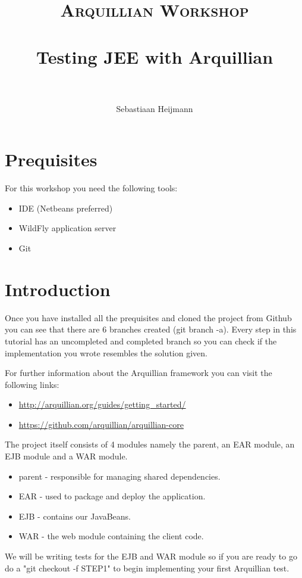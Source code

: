 \documentclass[paper=a4, fontsize=11pt]{scrartcl}
\title{
\normalfont \normalsize
\textsc{Arquillian Workshop} \\ [25pt] %
\horrule{0.5pt} \\[0.4cm] %
\huge Testing JEE with Arquillian\\ %
\horrule{2pt} \\[0.5cm] %
}
\author{Sebastiaan Heijmann} %
\begin{document}
\maketitle %

\tableofcontents

\section{Prequisites}
For this workshop you need the following tools:
\begin{itemize}
		\item IDE (Netbeans preferred)
		\item WildFly application server
		\item Git
\end{itemize}

\section{Introduction}
Once you have installed all the prequisites and cloned the project from Github
you can see that there are 6 branches created (git branch -a). Every step in
this tutorial has an uncompleted and completed branch so you can check if the
implementation you wrote resembles the solution given.
\par
For further information about the Arquillian framework you can visit the
following links:
\begin{itemize}
	\item \url{http://arquillian.org/guides/getting_started/}
	\item \url{https://github.com/arquillian/arquillian-core}
\end{itemize}
\par
The project itself consists of 4 modules namely the parent, an EAR module, an EJB
module and a WAR module.
\begin{itemize}
		\item parent - responsible for managing shared dependencies.
		\item EAR - used to package and deploy the application.
		\item EJB - contains our JavaBeans.
		\item WAR - the web module containing the client code.
\end{itemize}
We will be writing tests for the EJB and WAR module so if you are ready to go do
a "git checkout -f STEP1" to begin implementing your first Arquillian test.
\end{document}
